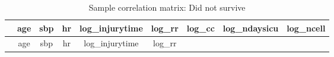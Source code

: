 \documentclass[
]{article}
\begin{document}
\begin{longtable}[]{@{}lcccccccc@{}}
\caption{Sample correlation matrix: Did not survive}\tabularnewline
\toprule
\begin{minipage}[b]{0.10\columnwidth}\raggedright
\strut
\end{minipage} & \begin{minipage}[b]{0.08\columnwidth}\centering
age\strut
\end{minipage} & \begin{minipage}[b]{0.08\columnwidth}\centering
sbp\strut
\end{minipage} & \begin{minipage}[b]{0.08\columnwidth}\centering
hr\strut
\end{minipage} & \begin{minipage}[b]{0.10\columnwidth}\centering
log\_injurytime\strut
\end{minipage} & \begin{minipage}[b]{0.08\columnwidth}\centering
log\_rr\strut
\end{minipage} & \begin{minipage}[b]{0.08\columnwidth}\centering
log\_cc\strut
\end{minipage} & \begin{minipage}[b]{0.09\columnwidth}\centering
log\_ndaysicu\strut
\end{minipage} & \begin{minipage}[b]{0.08\columnwidth}\centering
log\_ncell\strut
\end{minipage}\tabularnewline
\midrule
\endfirsthead
\toprule
\begin{minipage}[b]{0.10\columnwidth}\raggedright
\strut
\end{minipage} & \begin{minipage}[b]{0.08\columnwidth}\centering
age\strut
\end{minipage} & \begin{minipage}[b]{0.08\columnwidth}\centering
sbp\strut
\end{minipage} & \begin{minipage}[b]{0.08\columnwidth}\centering
hr\strut
\end{minipage} & \begin{minipage}[b]{0.10\columnwidth}\centering
log\_injurytime\strut
\end{minipage} & \begin{minipage}[b]{0.08\columnwidth}\centering
log\_rr\strut
\end{minipage} & \begin{minipage}[b]{0.08\columnwidth}\centering

\end{minipage}
\end{longtable}
\end{document}
